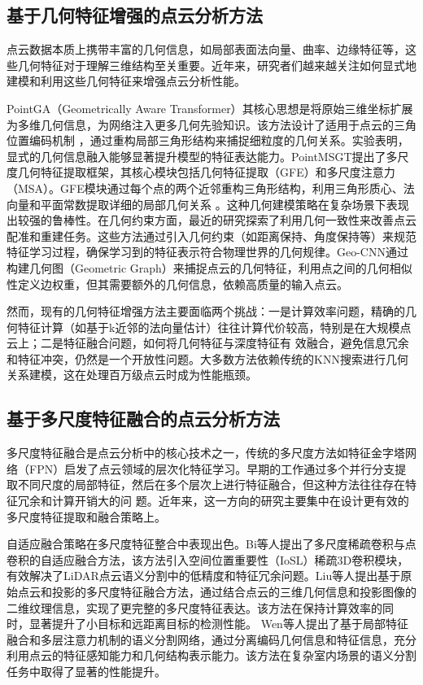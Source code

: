 \documentclass[preprint,12pt]{elsarticle}
\begin{document}
\subsection{基于几何特征增强的点云分析方法}
点云数据本质上携带丰富的几何信息，如局部表面法向量、曲率、边缘特征等，这些几何特征对于理解三维结构至关重要。近年来，研究者们越来越关注如何显式地建模和利用这些几何特征来增强点云分析性能。

PointGA（Geometrically Aware Transformer）\cite{pointga}其核心思想是将原始三维坐标扩展为多维几何信息，为网络注入更多几何先验知识。该方法设计了适用于点云的三角位置编码机制     
，通过重构局部三角形结构来捕捉细粒度的几何关系。实验表明，显式的几何信息融入能够显著提升模型的特征表达能力。PointMSGT\cite{pointmsgt}提出了多尺度几何特征提取框架，其核心模块包括几何特征提取（GFE）和多尺度注意力（MSA）。GFE模块通过每个点的两个近邻重构三角形结构，利用三角形质心、法向量和平面常数提取详细的局部几何关系      
。这种几何建模策略在复杂场景下表现出较强的鲁棒性。在几何约束方面，最近的研究\cite{gsrnet,geotransformer}探索了利用几何一致性来改善点云配准和重建任务。这些方法通过引入几何约束（如距离保持、角度保持等）来规范特征学习过程，确保学习到的特征表示符合物理世界的几何规律。Geo-CNN\cite{geo-cnn}通过构建几何图（Geometric
Graph）来捕捉点云的几何特征，利用点之间的几何相似性定义边权重，但其需要额外的几何信息，依赖高质量的输入点云。

然而，现有的几何特征增强方法主要面临两个挑战：一是计算效率问题，精确的几何特征计算（如基于k近邻的法向量估计）往往计算代价较高，特别是在大规模点云上；二是特征融合问题，如何将几何特征与深度特征有     
效融合，避免信息冗余和特征冲突，仍然是一个开放性问题。大多数方法依赖传统的KNN搜索进行几何关系建模，这在处理百万级点云时成为性能瓶颈。

  \subsection{基于多尺度特征融合的点云分析方法}
多尺度特征融合是点云分析中的核心技术之一，传统的多尺度方法如特征金字塔网络（FPN）启发了点云领域的层次化特征学习。早期的工作通过多个并行分支提取不同尺度的局部特征，然后在多个层次上进行特征融合，但这种方法往往存在特征冗余和计算开销大的问     
题。近年来，这一方向的研究主要集中在设计更有效的多尺度特征提取和融合策略上。

自适应融合策略在多尺度特征整合中表现出色。Bi等人\cite{adaptive_fusion_2025}提出了多尺度稀疏卷积与点卷积的自适应融合方法，该方法引入空间位置重要性（IoSL）稀疏3D卷积模块，有效解决了LiDAR点云语义分割中的低精度和特征冗余问题。Liu等人\cite{projection_based_fusion_2024}提出基于原始点云和投影的多尺度特征融合方法，通过结合点云的三维几何信息和投影图像的二维纹理信息，实现了更完整的多尺度特征表达。该方法在保持计算效率的同   时，显著提升了小目标和远距离目标的检测性能。
Wen等人\cite{local_feature_fusion_2024}提出了基于局部特征融合和多层注意力机制的语义分割网络，通过分离编码几何信息和特征信息，充分利用点云的特征感知能力和几何结构表示能力。该方法在复杂室内场景的语义分割任务中取得了显著的性能提升。
\end{document}
